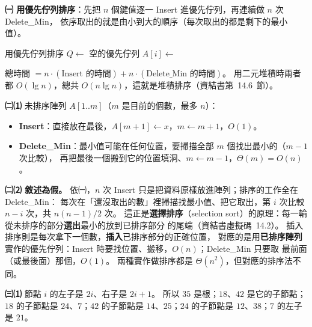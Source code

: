 \begin{pastsoln}

\textbf{㈠ 用優先佇列排序}：先把 $n$ 個鍵值逐一 Insert 進優先佇列，再連續做 $n$ 次 Delete\_Min，
依序取出的就是由小到大的順序（每次取出的都是剩下的最小值）。
\begin{pseudo}{用優先佇列排序}
    \State $Q \gets$ 空的優先佇列
        \State {}
    \EndFor
        \State $A[i] \gets$ 
    \EndFor
\EndProcedure
\end{pseudo}
總時間 $= n \cdot (\text{Insert 的時間}) + n \cdot (\text{Delete\_Min 的時間})$。 用二元堆積時兩者都
$O(\lg n)$，總共 $O(n \lg n)$，這就是堆積排序（資結書第~14.6~節）。

\textbf{㈡⑴} 未排序陣列 $A[1..m]$（$m$ 是目前的個數，最多 $n$）：
\begin{itemize}[nosep]
\item \textbf{Insert}：直接放在最後，$A[m+1] \gets x$，$m \gets m + 1$，$O(1)$。
\item \textbf{Delete\_Min}：最小值可能在任何位置，要掃描全部 $m$ 個找出最小的（$m - 1$ 次比較），
再把最後一個搬到它的位置填洞、$m \gets m - 1$，$\Theta(m) = O(n)$。
\end{itemize}

\textbf{㈡⑵ 敘述為假。} 依㈠，$n$ 次 Insert 只是把資料原樣放進陣列；排序的工作全在 Delete\_Min：
每次在「還沒取出的數」裡掃描找最小值、把它取出，第 $i$ 次比較 $n - i$ 次，共 $n(n-1)/2$ 次。
這正是\textbf{選擇排序}（selection sort）的原理：每一輪從未排序的部分\textbf{選出}最小的放到已排序部分
的尾端（資結書虛擬碼~14.2）。 插入排序則是每次拿下一個數，\textbf{插入}已排序部分的正確位置，
對應的是用\textbf{已排序陣列}實作的優先佇列：Insert 時要找位置、搬移，$O(n)$；Delete\_Min 只要取
最前面（或最後面）那個，$O(1)$。 兩種實作做排序都是 $\Theta(n^2)$，但對應的排序法不同。

\textbf{㈢⑴} 節點 $i$ 的左子是 $2i$、右子是 $2i + 1$。 所以 $35$ 是根；$18$、$42$ 是它的子節點；
$18$ 的子節點是 $24$、$7$；$42$ 的子節點是 $14$、$25$；$24$ 的子節點是 $12$、$38$；$7$ 的左子是
$21$。
\begin{center}
\end{center}


\end{pastsoln}
